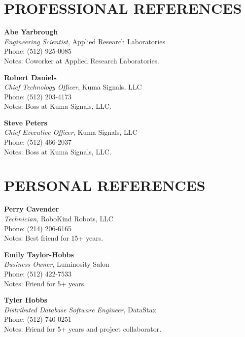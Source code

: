 \documentclass[line,margin=1in]{res}
\begin{document}
\address{1205 Larkwood Drive \\ Austin, Texas 78723}
\address{(512) 237-7562 \\ \url{jonstarr@utexas.edu}}
 
\begin{resume}

\section{PROFESSIONAL REFERENCES}
\vspace*{\baselineskip}

{\bf Abe Yarbrough} \\
{\sl Engineering Scientist}, Applied Research Laboratories \\
Phone: (512) 925-0085 \\
Notes: Coworker at Applied Research Laboratories.

{\bf Robert Daniels} \\
{\sl Chief Technology Officer}, Kuma Signals, LLC \\
Phone: (512) 203-4173 \\
Notes: Boss at Kuma Signals, LLC.

{\bf Steve Peters} \\
{\sl Chief Executive Officer}, Kuma Signals, LLC \\
Phone: (512) 466-2037 \\
Notes: Boss at Kuma Signals, LLC.

\section{PERSONAL REFERENCES}
\vspace*{\baselineskip}

{\bf Perry Cavender} \\
{\sl Technician}, RoboKind Robots, LLC \\
Phone: (214) 206-6165 \\
Notes: Best friend for 15+ years.

{\bf Emily Taylor-Hobbs} \\
{\sl Business Owner}, Luminosity Salon \\
Phone: (512) 422-7533 \\
Notes: Friend for 5+ years.

{\bf Tyler Hobbs} \\
{\sl Distributed Database Software Engineer}, DataStax \\
Phone: (512) 740-0251 \\
Notes: Friend for 5+ years and project collaborator.

\end{resume}
\end{document}
